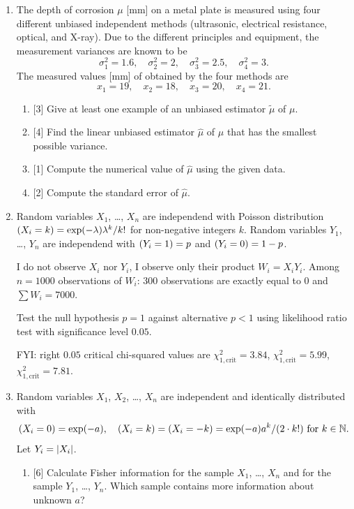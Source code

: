 \documentclass[12pt]{article}
\let\P\relax
\DeclareMathOperator{\P}{\mathbb{P}}
\newcommand{\NN}{\mathbb{N}}
\DeclarePairedDelimiter{\abs}{\lvert}{\rvert}
\begin{document}
\begin{enumerate}
\item  The depth of corrosion $\mu$ [mm] on a metal plate is measured using four different unbiased independent methods (ultrasonic, electrical resistance, optical, and X-ray). 
    Due to the different principles and equipment, the measurement variances are known to be
    \[
    \sigma_1^2 = 1.6,\quad \sigma_2^2 = 2,\quad \sigma_3^2 = 2.5,\quad \sigma_4^2 = 3.
    \]
    The measured values [mm] of obtained by the four methods are
    \[
    x_1 = 19,\quad x_2 = 18,\quad x_3 = 20,\quad x_4 = 21.
    \]    
    \begin{enumerate}
        \item {[3]} Give at least one example of an unbiased estimator \( \tilde{\mu} \) of \(\mu\).

        \item {[4]} Find the linear unbiased estimator \( \hat{\mu} \) of \( \mu \) that has the smallest possible variance.

        \item {[1]} Compute the numerical value of \( \hat{\mu} \) using the given data.

        \item {[2]} Compute the standard error of \( \hat{\mu} \).

    \end{enumerate}

\newpage

\item Random variables $X_1$, \dots, $X_n$ are independend with Poisson distribution $\P(X_i = k) = \exp(-\lambda)\lambda^k/ k!$ for non-negative integers $k$.
Random variables $Y_1$, \dots, $Y_n$ are independend with $\P(Y_i = 1) = p$ and $\P(Y_i = 0) = 1-p$.

I do not observe $X_i$ nor $Y_i$, I observe only their product $W_i = X_i Y_i$. 
Among $n=1000$ observations of $W_i$: $300$ observations are exactly equal to $0$ and $\sum W_i = 7000$.

Test the null hypothesis $p=1$ against alternative $p<1$ using likelihood ratio test with significance level $0.05$. 

FYI: right $0.05$ critical chi-squared values are $\chi^2_{1,\text{crit}} = 3.84$, $\chi^2_{1,\text{crit}} = 5.99$, $\chi^2_{1,\text{crit}} = 7.81$.

\item Random variables $X_1$, $X_2$, \dots, $X_n$ are independent and identically distributed with 
\[
\P(X_i = 0) = \exp(-a), \quad \P(X_i = k) = \P(X_i = -k) = \exp(-a)a^k / (2\cdot k!) \text{ for } k\in \NN.
\]
Let $Y_i = \abs{X_i}$.
\begin{enumerate}
    \item {[6]} Calculate Fisher information for the sample $X_1$, \dots, $X_n$ and for the sample $Y_1$, \dots, $Y_n$.
    Which sample contains more information about unknown $a$?


\end{enumerate}
\end{enumerate}
\end{document}
